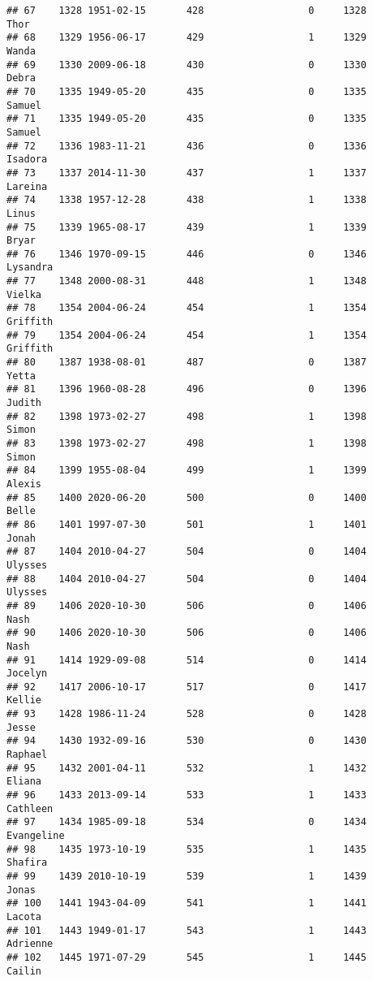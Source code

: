 \documentclass[
]{article}
\begin{document}
\begin{verbatim}
## 67    1328 1951-02-15       428                  0     1328       Thor
## 68    1329 1956-06-17       429                  1     1329      Wanda
## 69    1330 2009-06-18       430                  0     1330      Debra
## 70    1335 1949-05-20       435                  0     1335     Samuel
## 71    1335 1949-05-20       435                  0     1335     Samuel
## 72    1336 1983-11-21       436                  0     1336    Isadora
## 73    1337 2014-11-30       437                  1     1337    Lareina
## 74    1338 1957-12-28       438                  1     1338      Linus
## 75    1339 1965-08-17       439                  1     1339      Bryar
## 76    1346 1970-09-15       446                  0     1346   Lysandra
## 77    1348 2000-08-31       448                  1     1348     Vielka
## 78    1354 2004-06-24       454                  1     1354   Griffith
## 79    1354 2004-06-24       454                  1     1354   Griffith
## 80    1387 1938-08-01       487                  0     1387      Yetta
## 81    1396 1960-08-28       496                  0     1396     Judith
## 82    1398 1973-02-27       498                  1     1398      Simon
## 83    1398 1973-02-27       498                  1     1398      Simon
## 84    1399 1955-08-04       499                  1     1399     Alexis
## 85    1400 2020-06-20       500                  0     1400      Belle
## 86    1401 1997-07-30       501                  1     1401      Jonah
## 87    1404 2010-04-27       504                  0     1404    Ulysses
## 88    1404 2010-04-27       504                  0     1404    Ulysses
## 89    1406 2020-10-30       506                  0     1406       Nash
## 90    1406 2020-10-30       506                  0     1406       Nash
## 91    1414 1929-09-08       514                  0     1414    Jocelyn
## 92    1417 2006-10-17       517                  0     1417     Kellie
## 93    1428 1986-11-24       528                  0     1428      Jesse
## 94    1430 1932-09-16       530                  0     1430    Raphael
## 95    1432 2001-04-11       532                  1     1432     Eliana
## 96    1433 2013-09-14       533                  1     1433   Cathleen
## 97    1434 1985-09-18       534                  0     1434 Evangeline
## 98    1435 1973-10-19       535                  1     1435    Shafira
## 99    1439 2010-10-19       539                  1     1439      Jonas
## 100   1441 1943-04-09       541                  1     1441     Lacota
## 101   1443 1949-01-17       543                  1     1443   Adrienne
## 102   1445 1971-07-29       545                  1     1445     Cailin

\end{verbatim}
\end{document}
